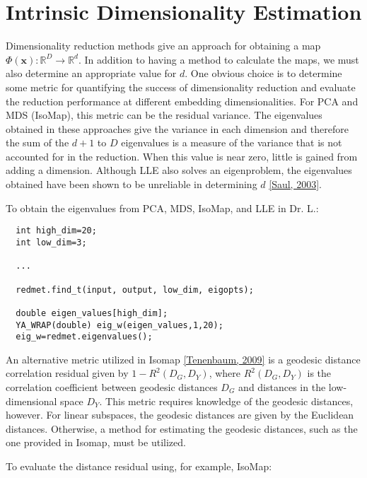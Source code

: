 \par
 \par
 \hypertarget{index_intrinsic}{}\section{Intrinsic Dimensionality Estimation}\label{index_intrinsic}
Dimensionality reduction methods give an approach for obtaining a map $\Phi(\mathbf{x}) : \mathbb{R}^D \rightarrow \mathbb{R}^d$. In addition to having a method to calculate the maps, we must also determine an appropriate value for $d$. One obvious choice is to determine some metric for quantifying the success of dimensionality reduction and evaluate the reduction performance at different embedding dimensionalities. For PCA and MDS (Iso\-Map), this metric can be the residual variance. The eigenvalues obtained in these approaches give the variance in each dimension and therefore the sum of the $d+1$ to $D$ eigenvalues is a measure of the variance that is not accounted for in the reduction. When this value is near zero, little is gained from adding a dimension. Although LLE also solves an eigenproblem, the eigenvalues obtained have been shown to be unreliable in determining $d$ \hyperlink{index_ref}{\mbox{[}Saul, 2003\mbox{]}}.

To obtain the eigenvalues from PCA, MDS, Iso\-Map, and LLE in Dr. L.:



\footnotesize\begin{verbatim}  int high_dim=20;
  int low_dim=3;
  
  ...
  
  redmet.find_t(input, output, low_dim, eigopts);
  
  double eigen_values[high_dim];
  YA_WRAP(double) eig_w(eigen_values,1,20);
  eig_w=redmet.eigenvalues();
\end{verbatim}
\normalsize


An alternative metric utilized in Isomap \hyperlink{index_ref}{\mbox{[}Tenenbaum, 2009\mbox{]}} is a geodesic distance correlation residual given by $1-R^2(D_G,D_Y)$, where $R^2(D_G,D_Y)$ is the correlation coefficient between geodesic distances $D_G$ and distances in the low-dimensional space $D_Y$. This metric requires knowledge of the geodesic distances, however. For linear subspaces, the geodesic distances are given by the Euclidean distances. Otherwise, a method for estimating the geodesic distances, such as the one provided in Isomap, must be utilized.

To evaluate the distance residual using, for example, Iso\-Map:



